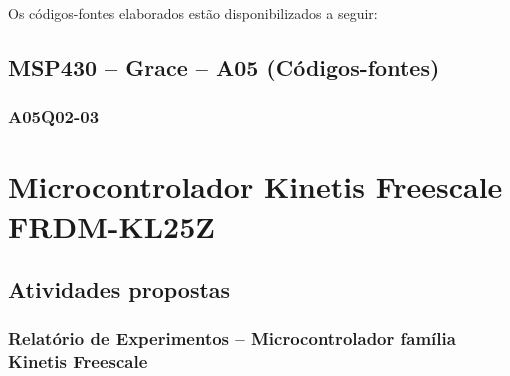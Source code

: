 \documentclass[
	12pt,				%
	openright,			%
  oneside,     %
	a4paper,			%
	english,			%
	french,				%
	spanish,			%
	brazil				%
	]{abntex2}
\begin{document}
\newpage
Os códigos-fontes elaborados estão disponibilizados a seguir:
\section*{MSP430 -- Grace -- A05 (Códigos-fontes)}
\label{sec:GraceA05Q03}
\subsection*{A05Q02-03}






%
%

\chapter{Microcontrolador Kinetis Freescale FRDM-KL25Z} %
\label{cha:6-microcontrolador_kinetis_freescale}

\section{Atividades propostas} %
\label{sec:kinetis_freescale-atividades_propostas}

\subsection*{Relatório de Experimentos -- Microcontrolador família Kinetis Freescale}
\end{document}
